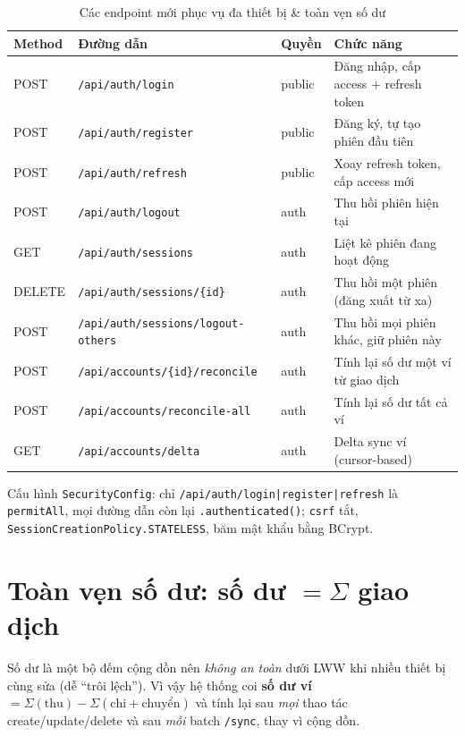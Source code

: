 \documentclass[11pt,a4paper]{article}
\begin{document}
\begin{table}[ht]
\centering
\caption{Các endpoint mới phục vụ đa thiết bị \& toàn vẹn số dư}
\label{tab:endpoints}
\begin{tabular}{@{}llll@{}}
\toprule
\textbf{Method} & \textbf{Đường dẫn} & \textbf{Quyền} & \textbf{Chức năng} \\
\midrule
POST   & \texttt{/api/auth/login}                    & public & Đăng nhập, cấp access + refresh token \\
POST   & \texttt{/api/auth/register}                 & public & Đăng ký, tự tạo phiên đầu tiên \\
POST   & \texttt{/api/auth/refresh}                  & public & Xoay refresh token, cấp access mới \\
POST   & \texttt{/api/auth/logout}                   & auth   & Thu hồi phiên hiện tại \\
GET    & \texttt{/api/auth/sessions}                 & auth   & Liệt kê phiên đang hoạt động \\
DELETE & \texttt{/api/auth/sessions/\{id\}}          & auth   & Thu hồi một phiên (đăng xuất từ xa) \\
POST   & \texttt{/api/auth/sessions/logout-others}   & auth   & Thu hồi mọi phiên khác, giữ phiên này \\
\midrule
POST   & \texttt{/api/accounts/\{id\}/reconcile}     & auth   & Tính lại số dư một ví từ giao dịch \\
POST   & \texttt{/api/accounts/reconcile-all}        & auth   & Tính lại số dư tất cả ví \\
GET    & \texttt{/api/accounts/delta}                & auth   & Delta sync ví (cursor-based) \\
\bottomrule
\end{tabular}
\end{table}

\noindent Cấu hình \texttt{SecurityConfig}: chỉ \texttt{/api/auth/login|register|refresh} là
\texttt{permitAll}, mọi đường dẫn còn lại \texttt{.authenticated()}; \texttt{csrf} tắt,
\texttt{SessionCreationPolicy.STATELESS}, băm mật khẩu bằng BCrypt.

\section{Toàn vẹn số dư: số dư $=\Sigma$ giao dịch}
\label{sec:balance}

Số dư là một bộ đếm cộng dồn nên \emph{không an toàn} dưới LWW khi nhiều thiết bị cùng sửa
(dễ ``trôi lệch''). Vì vậy hệ thống coi \textbf{số dư ví $=\Sigma(\text{thu}) - \Sigma(\text{chi}+\text{chuyển})$}
và tính lại sau \emph{mọi} thao tác create/update/delete và sau \emph{mỗi} batch \texttt{/sync},
thay vì cộng dồn.
\end{document}
